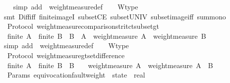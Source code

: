 \begin{isabellebody}
%
\isadelimproof
\ \ %
\endisadelimproof
%
\isatagproof
{}\isamarkupfalse%
\ {\isacharparenleft}simp\ add{\isacharcolon}\ \ weight{\isacharunderscore}measure{\isacharunderscore}def{\isacharparenright}\isanewline
\ \ \isamarkupfalse%
\ W{\isacharunderscore}type\isanewline
\ \ \isamarkupfalse%
\ {\isacharparenleft}smt\ Diff{\isacharunderscore}iff\ finite{\isacharunderscore}imageI\ subsetCE\ subset{\isacharunderscore}UNIV\ subset{\isacharunderscore}image{\isacharunderscore}iff\ sum{\isacharunderscore}mono{}{\isacharparenright}%
\endisatagproof
{\isafoldproof}%
%
\isadelimproof
\isanewline
%
\endisadelimproof
\isanewline
{}\isamarkupfalse%
\ {\isacharparenleft}\ Protocol{\isacharparenright}\ weight{\isacharunderscore}measure{\isacharunderscore}comparison{\isacharunderscore}stritct{\isacharunderscore}subset{\isacharunderscore}gt\ {\isacharcolon}\isanewline
\ \ {\isachardoublequoteopen}finite\ A\ {\isasymLongrightarrow}\ finite\ B\ {\isasymLongrightarrow}\ B\ {\isasymsubset}\ A\ {\isasymLongrightarrow}\ weight{\isacharunderscore}measure\ A\ {\isachargreater}\ weight{\isacharunderscore}measure\ B{\isachardoublequoteclose}\isanewline
%
\isadelimproof
\ \ %
\endisadelimproof
%
\isatagproof
{}\isamarkupfalse%
\ {\isacharparenleft}simp\ add{\isacharcolon}\ \ weight{\isacharunderscore}measure{\isacharunderscore}def{\isacharparenright}\isanewline
\ \ \isamarkupfalse%
\ W{\isacharunderscore}type\isanewline
\ \ \isamarkupfalse%
%
\endisatagproof
{\isafoldproof}%
%
\isadelimproof
\isanewline
%
\endisadelimproof
\isanewline
{}\isamarkupfalse%
\ {\isacharparenleft}\ Protocol{\isacharparenright}\ weight{\isacharunderscore}measure{\isacharunderscore}gt{\isacharunderscore}set{\isacharunderscore}difference\ {\isacharcolon}\isanewline
\ \ {\isachardoublequoteopen}finite\ A\ {\isasymLongrightarrow}\ finite\ B\ {\isasymLongrightarrow}\ B\ {\isasymnoteq}\ {\isasymemptyset}\ {\isasymLongrightarrow}\ weight{\isacharunderscore}measure\ A\ {\isachargreater}\ weight{\isacharunderscore}measure\ {\isacharparenleft}A\ {\isacharminus}\ B{\isacharparenright}{\isachardoublequoteclose}\isanewline
%
\isadelimproof
\ \ %
\endisadelimproof
%
\isatagproof
{}\isamarkupfalse%
%
\endisatagproof
{\isafoldproof}%
%
\isadelimproof
\isanewline
%
\endisadelimproof
\isanewline
\isanewline
{}\isamarkupfalse%
\ {\isacharparenleft}\ Params{\isacharparenright}\ equivocation{\isacharunderscore}fault{\isacharunderscore}weight\ {\isacharcolon}{\isacharcolon}\ {\isachardoublequoteopen}state\ {\isasymRightarrow}\ real{\isachardoublequoteclose}\isanewline

\end{isabellebody}

